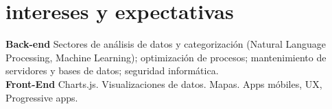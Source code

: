 \documentclass[espanol, print]{cv-style}     %
\begin{document}
\section{intereses y expectativas}
  \vspace{-0.2cm}
\textbf{Back-end} Sectores de análisis de datos y categorización (Natural Language Processing, Machine Learning); optimización de procesos; mantenimiento de servidores y bases de datos; seguridad informática.\\
\textbf{Front-End} Charts.js. Visualizaciones de datos. Mapas. Apps móbiles, UX, Progressive apps.
\end{document}
